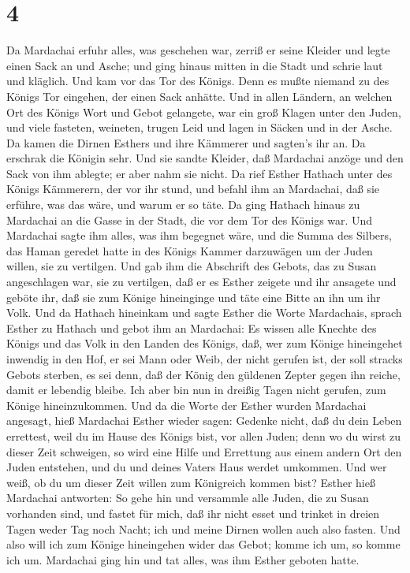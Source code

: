 \hypertarget{section-3}{%
\section{4}\label{section-3}}

 Da Mardachai erfuhr alles, was geschehen war, zerriß er
seine Kleider und legte einen Sack an und Asche; und ging hinaus mitten
in die Stadt und schrie laut und kläglich.  Und kam vor das
Tor des Königs. Denn es mußte niemand zu des Königs Tor eingehen, der
einen Sack anhätte.  Und in allen Ländern, an welchen Ort
des Königs Wort und Gebot gelangete, war ein groß Klagen unter den
Juden, und viele fasteten, weineten, trugen Leid und lagen in Säcken und
in der Asche.  Da kamen die Dirnen Esthers und ihre Kämmerer
und sagten's ihr an. Da erschrak die Königin sehr. Und sie sandte
Kleider, daß Mardachai anzöge und den Sack von ihm ablegte; er aber nahm
sie nicht.  Da rief Esther Hathach unter des Königs
Kämmerern, der vor ihr stund, und befahl ihm an Mardachai, daß sie
erführe, was das wäre, und warum er so täte.  Da ging
Hathach hinaus zu Mardachai an die Gasse in der Stadt, die vor dem Tor
des Königs war.  Und Mardachai sagte ihm alles, was ihm
begegnet wäre, und die Summa des Silbers, das Haman geredet hatte in des
Königs Kammer darzuwägen um der Juden willen, sie zu vertilgen.
 Und gab ihm die Abschrift des Gebots, das zu Susan
angeschlagen war, sie zu vertilgen, daß er es Esther zeigete und ihr
ansagete und geböte ihr, daß sie zum Könige hineinginge und täte eine
Bitte an ihn um ihr Volk.  Und da Hathach hineinkam und
sagte Esther die Worte Mardachais,  sprach Esther zu
Hathach und gebot ihm an Mardachai:  Es wissen alle Knechte
des Königs und das Volk in den Landen des Königs, daß, wer zum Könige
hineingehet inwendig in den Hof, er sei Mann oder Weib, der nicht
gerufen ist, der soll stracks Gebots sterben, es sei denn, daß der König
den güldenen Zepter gegen ihn reiche, damit er lebendig bleibe. Ich aber
bin nun in dreißig Tagen nicht gerufen, zum Könige hineinzukommen.
 Und da die Worte der Esther wurden Mardachai angesagt,
 hieß Mardachai Esther wieder sagen: Gedenke nicht, daß du
dein Leben errettest, weil du im Hause des Königs bist, vor allen Juden;
 denn wo du wirst zu dieser Zeit schweigen, so wird eine
Hilfe und Errettung aus einem andern Ort den Juden entstehen, und du und
deines Vaters Haus werdet umkommen. Und wer weiß, ob du um dieser Zeit
willen zum Königreich kommen bist?  Esther hieß Mardachai
antworten:  So gehe hin und versammle alle Juden, die zu
Susan vorhanden sind, und fastet für mich, daß ihr nicht esset und
trinket in dreien Tagen weder Tag noch Nacht; ich und meine Dirnen
wollen auch also fasten. Und also will ich zum Könige hineingehen wider
das Gebot; komme ich um, so komme ich um.  Mardachai ging
hin und tat alles, was ihm Esther geboten hatte.

